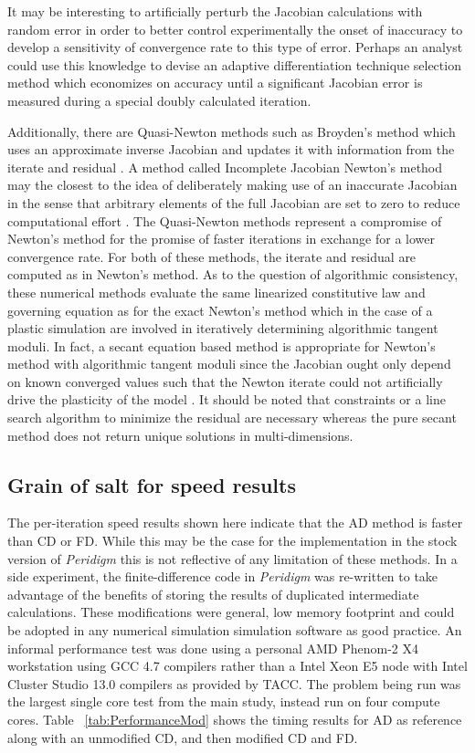 \documentclass[preprint,12pt]{elsarticle}
\begin{document}
It may be interesting to artificially perturb the Jacobian calculations with
random error in order to better control experimentally the onset of inaccuracy
to develop a sensitivity of convergence rate to this type of error. Perhaps an
analyst could use this knowledge to devise an adaptive differentiation
technique selection method which economizes on accuracy until a significant
Jacobian error is measured during a special doubly calculated iteration.

Additionally, there are Quasi-Newton methods such as Broyden's method which
uses an approximate inverse Jacobian and updates it with information from the 
iterate and residual \cite{dennis1971convergence}. A method called
Incomplete Jacobian Newton's method may the closest to the idea of deliberately
making use of an inaccurate Jacobian in the sense that arbitrary elements of
the full Jacobian are set to zero to reduce computational effort
\cite{liu2008incomplete}. The Quasi-Newton methods represent a compromise of
Newton's method for the promise of faster iterations in exchange for a lower
convergence rate. For both of these methods, the iterate and residual are
computed as in Newton's method. As to the question of algorithmic consistency,
these numerical methods evaluate the same linearized constitutive law and
governing equation as for the exact Newton's method which in the case of a
plastic simulation are involved in iteratively determining algorithmic tangent moduli. 
In fact, a secant equation based method is appropriate for Newton's method with algorithmic
tangent moduli since the Jacobian ought only depend on known converged
values such that the Newton iterate could not artificially drive the plasticity
of the model \cite[Chap. 6]{belytschko1999nonlinear}. It should be noted that
constraints or a line search algorithm to minimize the residual are necessary
whereas the pure secant method does not return unique solutions in
multi-dimensions.
%

\subsection{Grain of salt for speed results}
The per-iteration speed results shown here indicate that the AD method is
faster than CD or FD.  While this may be the case for the implementation in the
stock version of \emph{Peridigm} this is not reflective of any limitation of
these methods. In a side experiment, the finite-difference code in
\emph{Peridigm} was re-written to take advantage of the benefits of storing the
results of duplicated intermediate calculations. These modifications were 
general, low memory footprint and could be adopted in any numerical simulation
simulation software as good practice. An informal performance test was done
using a personal AMD Phenom-2 X4 workstation using GCC 4.7 compilers rather than a
Intel Xeon E5 node with Intel Cluster Studio 13.0 compilers as provided by TACC. The problem
being run was the largest single core test from the main study, instead run on four 
compute cores. Table ~\ref{tab:PerformanceMod} shows the timing
results for AD as reference along with an unmodified CD, and then modified CD
and FD.
\end{document}
